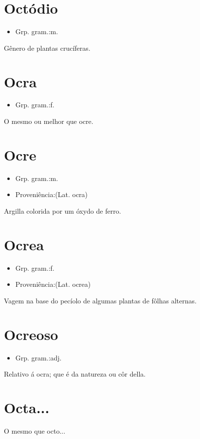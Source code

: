 \section{Octódio}
\begin{itemize}
\item {Grp. gram.:m.}
\end{itemize}
Gênero de plantas crucíferas.
\section{Ocra}
\begin{itemize}
\item {Grp. gram.:f.}
\end{itemize}
O mesmo ou melhor que \textunderscore ocre\textunderscore .
\section{Ocre}
\begin{itemize}
\item {Grp. gram.:m.}
\end{itemize}
\begin{itemize}
\item {Proveniência:(Lat. \textunderscore ocra\textunderscore )}
\end{itemize}
Argilla colorida por um óxydo de ferro.
\section{Ocrea}
\begin{itemize}
\item {Grp. gram.:f.}
\end{itemize}
\begin{itemize}
\item {Proveniência:(Lat. \textunderscore ocrea\textunderscore )}
\end{itemize}
Vagem na base do pecíolo de algumas plantas de fôlhas alternas.
\section{Ocreoso}
\begin{itemize}
\item {Grp. gram.:adj.}
\end{itemize}
Relativo á ocra; que é da natureza ou côr della.
\section{Octa...}
O mesmo que \textunderscore octo...\textunderscore 
